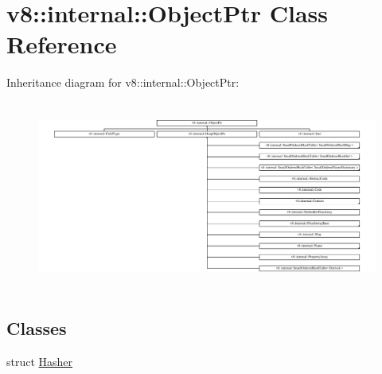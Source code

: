 \hypertarget{classv8_1_1internal_1_1ObjectPtr}{}\section{v8\+:\+:internal\+:\+:Object\+Ptr Class Reference}
\label{classv8_1_1internal_1_1ObjectPtr}
Inheritance diagram for v8\+:\+:internal\+:\+:Object\+Ptr\+:\begin{figure}[H]
\begin{center}
\leavevmode
\includegraphics[height=6.251993cm]{classv8_1_1internal_1_1ObjectPtr}
\end{center}
\end{figure}
\subsection*{Classes}
\begin{DoxyCompactItemize}
\item 
struct \mbox{\hyperlink{structv8_1_1internal_1_1ObjectPtr_1_1Hasher}{Hasher}}
\end{DoxyCompactItemize}

